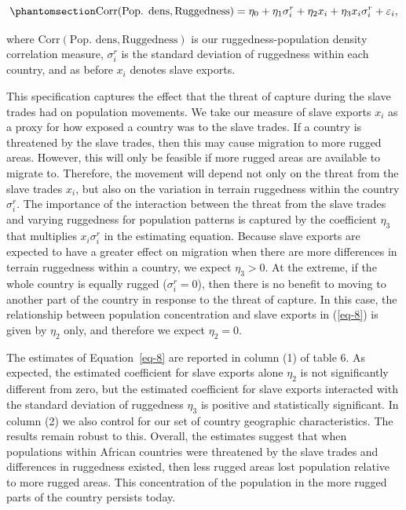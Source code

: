 \documentclass[
  letterpaper,
  DIV=11,
  numbers=noendperiod]{scrartcl}
\begin{document}
\begin{equation}\protect\phantomsection\label{eq-8}{
\text{Corr}(\text{Pop. dens}, \text{Ruggedness}) = \eta_0 + \eta_1 \sigma_i^r + \eta_2 x_i + \eta_3 x_i \sigma_i^r + \varepsilon_i,
}\end{equation}

where \(\text{Corr}(\text{Pop. dens}, \text{Ruggedness})\) is our
ruggedness-population density correlation measure, \(\sigma^r_i\) is the
standard deviation of ruggedness within each country, and as before
\(x_i\) denotes slave exports.

This specification captures the effect that the threat of capture during
the slave trades had on population movements. We take our measure of
slave exports \(x_i\) as a proxy for how exposed a country was to the
slave trades. If a country is threatened by the slave trades, then this
may cause migration to more rugged areas. However, this will only be
feasible if more rugged areas are available to migrate to. Therefore,
the movement will depend not only on the threat from the slave trades
\(x_i\), but also on the variation in terrain ruggedness within the
country \(\sigma^r_i\). The importance of the interaction between the
threat from the slave trades and varying ruggedness for population
patterns is captured by the coefficient \(\eta_3\) that multiplies
\(x_i \sigma^r_i\) in the estimating equation. Because slave exports are
expected to have a greater effect on migration when there are more
differences in terrain ruggedness within a country, we expect
\(\eta_3 > 0\). At the extreme, if the whole country is equally rugged
(\(\sigma^r_i = 0\)), then there is no benefit to moving to another part
of the country in response to the threat of capture. In this case, the
relationship between population concentration and slave exports in
(\ref{eq-8}) is given by \(\eta_2\) only, and therefore we expect
\(\eta_2 = 0\).

The estimates of Equation~\ref{eq-8} are reported in column (1) of table
6. As expected, the estimated coefficient for slave exports alone
\(\eta_2\) is not significantly different from zero, but the estimated
coefficient for slave exports interacted with the standard deviation of
ruggedness \(\eta_3\) is positive and statistically significant. In
column (2) we also control for our set of country geographic
characteristics. The results remain robust to this. Overall, the
estimates suggest that when populations within African countries were
threatened by the slave trades and differences in ruggedness existed,
then less rugged areas lost population relative to more rugged areas.
This concentration of the population in the more rugged parts of the
country persists today.
\end{document}
